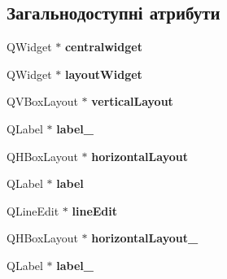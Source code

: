 \subsection*{Загальнодоступні атрибути}
\begin{DoxyCompactItemize}
\item 
\hypertarget{classUi__MainWindow_a39420100bfee3ba57f137af5a3b0f8e9}{Q\-Widget $\ast$ {\bfseries centralwidget}}\label{classUi__MainWindow_a39420100bfee3ba57f137af5a3b0f8e9}

\item 
\hypertarget{classUi__MainWindow_a6356443dc067ef5164e2f4dc834e640b}{Q\-Widget $\ast$ {\bfseries layout\-Widget}}\label{classUi__MainWindow_a6356443dc067ef5164e2f4dc834e640b}

\item 
\hypertarget{classUi__MainWindow_a649287f742c9a33b8444116dccb1b72b}{Q\-V\-Box\-Layout $\ast$ {\bfseries vertical\-Layout}}\label{classUi__MainWindow_a649287f742c9a33b8444116dccb1b72b}

\item 
\hypertarget{classUi__MainWindow_a253fbc5b44941384321b7c58cf96cc65}{Q\-Label $\ast$ {\bfseries label\-\_}}\label{classUi__MainWindow_a253fbc5b44941384321b7c58cf96cc65}

\item 
\hypertarget{classUi__MainWindow_ae7104d878681f568e492c5bd0f653157}{Q\-H\-Box\-Layout $\ast$ {\bfseries horizontal\-Layout}}\label{classUi__MainWindow_ae7104d878681f568e492c5bd0f653157}

\item 
\hypertarget{classUi__MainWindow_a78edcdd12ea78c06d7e80f322c8882f9}{Q\-Label $\ast$ {\bfseries label}}\label{classUi__MainWindow_a78edcdd12ea78c06d7e80f322c8882f9}

\item 
\hypertarget{classUi__MainWindow_a9ec10ad6d77a53c0ace94da924121d13}{Q\-Line\-Edit $\ast$ {\bfseries line\-Edit}}\label{classUi__MainWindow_a9ec10ad6d77a53c0ace94da924121d13}

\item 
\hypertarget{classUi__MainWindow_a9ee21d2c2bc000e7a8ba931bacfc5a69}{Q\-H\-Box\-Layout $\ast$ {\bfseries horizontal\-Layout\-\_}}\label{classUi__MainWindow_a9ee21d2c2bc000e7a8ba931bacfc5a69}

\item 
\hypertarget{classUi__MainWindow_a2f5576686ce98bcc41bd1b1eca07e56a}{Q\-Label $\ast$ {\bfseries label\-\_}}\label{classUi__MainWindow_a2f5576686ce98bcc41bd1b1eca07e56a}


\end{DoxyCompactItemize}
